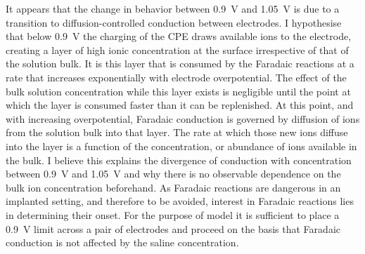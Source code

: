         It appears that the change in behavior between \SI{0.9}{\volt} and \SI{1.05}{\volt} is due to a transition to diffusion-controlled conduction between electrodes.
        I hypothesise that below \SI{0.9}{\volt} the charging of the CPE draws available ions to the electrode, creating a layer of high ionic concentration at the surface irrespective of that of the solution bulk.
        It is this layer that is consumed by the Faradaic reactions at a rate that increases exponentially with electrode overpotential.
        The effect of the bulk solution concentration while this layer exists is negligible until the point at which the layer is consumed faster than it can be replenished.
        At this point, and with increasing overpotential, Faradaic conduction is governed by diffusion of ions from the solution bulk into that layer.
        The rate at which those new ions diffuse into the layer is a function of the concentration, or abundance of ions available in the bulk.
        I believe this explains the divergence of conduction with concentration between \SI{0.9}{\volt} and \SI{1.05}{\volt} and why there is no observable dependence on the bulk ion concentration beforehand.
        As Faradaic reactions are dangerous in an implanted setting, and therefore to be avoided, interest in Faradaic reactions lies in determining their onset.
        For the purpose of model it is sufficient to place a \SI{0.9}{\volt} limit across a pair of electrodes and proceed on the basis that Faradaic conduction is not affected by the saline concentration.

